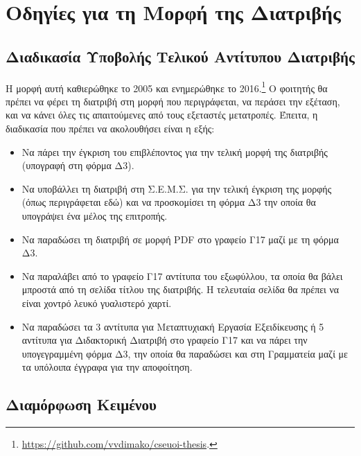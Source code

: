 \chapter{Οδηγίες για τη Μορφή της Διατριβής}
\label{ch:Instructions}


\section{Διαδικασία Υποβολής Τελικού Αντίτυπου Διατριβής}
\label{sec:Submission}
Η μορφή αυτή καθιερώθηκε το 2005 και ενημερώθηκε το 2016.\footnote{\url{https://github.com/vvdimako/cseuoi-thesis}.}
Ο φοιτητής θα πρέπει να φέρει τη διατριβή στη μορφή που περιγράφεται, να περάσει την εξέταση, και να κάνει όλες τις απαιτούμενες από τους εξεταστές μετατροπές.
Έπειτα, η διαδικασία που πρέπει να ακολουθήσει είναι η εξής:
\begin{itemize}
	\item Να πάρει την έγκριση του επιβλέποντος για την τελική μορφή της διατριβής (υπογραφή στη φόρμα Δ3).
	\item Να υποβάλλει τη διατριβή στη Σ.Ε.Μ.Σ. για την τελική έγκριση της μορφής (όπως περιγράφεται εδώ) και να προσκομίσει τη φόρμα Δ3 την οποία θα υπογράψει ένα μέλος της επιτροπής.
	\item Να παραδώσει τη διατριβή σε μορφή PDF στο γραφείο Γ17 μαζί με τη φόρμα Δ3.
	\item Να παραλάβει από το γραφείο Γ17 αντίτυπα του εξωφύλλου, τα οποία θα βάλει μπροστά από τη σελίδα τίτλου της διατριβής. H τελευταία σελίδα θα πρέπει να είναι χοντρό λευκό γυαλιστερό χαρτί.
	\item Να παραδώσει τα 3 αντίτυπα για Μεταπτυχιακή Εργασία Εξειδίκευσης ή 5 αντίτυπα για Διδακτορική Διατριβή στο γραφείο Γ17 και να πάρει την υπογεγραμμένη φόρμα Δ3, την οποία θα παραδώσει και στη Γραμματεία μαζί με τα υπόλοιπα έγγραφα για την αποφοίτηση.
\end{itemize}


\section{Διαμόρφωση Κειμένου}
\label{sec:Text}

